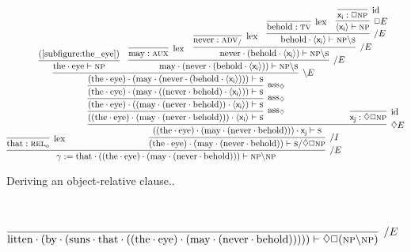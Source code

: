 \begin{figure}[ht]
	\centering
	\begin{subfigure}{1\textwidth}
		\smaller
		\[
			\infer[\divright E]{\gamma := \w{that}\sbind((\w{the}\sbind\w{eye})\sbind(\w{may}\sbind(\w{never}\sbind\w{behold}))) \vdash \np\divleft\np}{
				\infer[\Lex]{\w{that} : \subcat{l}{rel}{o}}{}
				&
				\hspace{-40pt}\infer[\divright I]{(\w{the}\sbind\w{eye})\sbind(\w{may}\sbind(\w{never}\sbind\w{behold})) \vdash \s\divright\diamond\Box\np}{
						\infer[\diamond E]{((\w{the}\sbind\w{eye})\sbind(\w{may}\sbind(\w{never}\sbind\w{behold})))\sbind\term{x_j}\vdash \s}{
							\infer[\rulestyle{ass}_{\diamond}]{((\w{the}\sbind\w{eye})\sbind(\w{may}\sbind(\w{never}\sbind\w{behold})))\sbind\bracket{\term{x_i }}\vdash \s}{
								\infer[\rulestyle{ass}_{\diamond}]{(\w{the}\sbind\w{eye})\sbind((\w{may}\sbind(\w{never}\sbind\w{behold}))\sbind\bracket{\term{x_i }})\vdash \s}{
									\infer[\rulestyle{ass}_{\diamond}]{(\w{the}\sbind\w{eye})\sbind(\w{may}\sbind((\w{never}\sbind\w{behold})\sbind\bracket{\term{x_i }}))\vdash \s}{
										\infer[\divleft E]{(\w{the}\sbind\w{eye})\sbind(\w{may}\sbind(\w{never}\sbind(\w{behold}\sbind\bracket{\term{x_i }})))\vdash \s}{
											\infer{\w{the}\sbind\w{eye} \vdash \np}{\text{(\ref{subfigure:the_eye})}}
											&
											\infer[\divright E]{\w{may}\sbind(\w{never}\sbind(\w{behold}\sbind\bracket{\term{x_i }})) \vdash \np\divleft\s}{
												\infer[\Lex]{\w{may} : \gtype{aux}}{}
												&
												\infer[\divright E]{\w{never}\sbind(\w{behold}\sbind\bracket{\term{x_i }}) \vdash \np\divleft\s}{
													\infer[\Lex]{\w{never}:\smallgtype{adv}_{\divright}}{}
													&
													\infer[\divright E]{\w{behold}\sbind{\bracket{\term{x_i }}} \vdash \np\divleft\s}{
														\infer[\Lex]{\w{behold}: \gtype[l]{tv}}{}
														&
														\infer[\Box E]{\bracket{\term{x_i }} \vdash \np}{
															\infer[\Ax]{\term{x_i } : \Box \np}{}
														}
													}
												}
											}
										}
									}
								}
							}						
							&
							\hspace{-52pt}
							\infer[\Ax]{\term{x_j}: \diamond\Box \np}{}
						}
					}
				}
		\]
		\caption{Deriving an object-relative clause..}
		\label{subfigure:lovecraft_rel_clause:rc}
	\end{subfigure}\\[\smallsep]
	\begin{subfigure}{1\textwidth}
		\smaller
		\[
			\infer[\divright E]{\w{litten}\sbind(\w{by}\sbind(\w{suns}\sbind\w{that}\sbind((\w{the}\sbind\w{eye})\sbind(\w{may}\sbind(\w{never}\sbind\w{behold}))))) \vdash \diamond\Box(\np\divleft\np)}{
}\]
\end{subfigure}
\end{figure}

